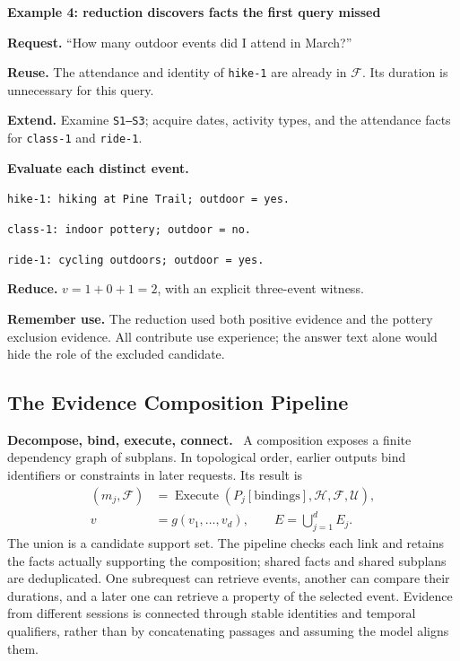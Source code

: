 \documentclass[10pt,twocolumn]{article}
\newcommand{\Hh}{\mathcal{H}}
\newcommand{\Ff}{\mathcal{F}}
\newcommand{\Uu}{\mathcal{U}}
\newcommand{\runin}[1]{\smallskip\noindent\textbf{#1.}\ }
\newenvironment{memoryexample}[1]{%
  \def\FrameCommand{\fboxrule=0.7pt\fboxsep=6pt\fbox}%
  \begin{framed}\small\noindent\textbf{#1}\par\smallskip
}{\end{framed}}
\begin{document}
\begin{memoryexample}{Example 4: reduction discovers facts the first query missed}
\textbf{Request.} ``How many outdoor events did I attend in March?''
\par\textbf{Reuse.} The attendance and identity of \texttt{hike-1} are
already in $\Ff$. Its duration is unnecessary for this query.
\par\textbf{Extend.} Examine \texttt{S1--S3}; acquire dates, activity
types, and the attendance facts for \texttt{class-1} and \texttt{ride-1}.
\par\textbf{Evaluate each distinct event.}
\par\texttt{hike-1: hiking at Pine Trail; outdoor = yes.}
\par\texttt{class-1: indoor pottery; outdoor = no.}
\par\texttt{ride-1: cycling outdoors; outdoor = yes.}
\par\textbf{Reduce.} $v=1+0+1=2$, with an explicit three-event witness.
\par\textbf{Remember use.} The reduction used both positive evidence
and the pottery exclusion evidence. All contribute use experience;
the answer text alone would hide the role of the excluded candidate.
\end{memoryexample}

\subsection{The Evidence Composition Pipeline}
\label{subsec:new-compose}

\runin{Decompose, bind, execute, connect}
A composition exposes a finite dependency graph of subplans. In
topological order, earlier outputs bind identifiers or constraints in
later requests. Its result is
\begin{align}
\label{eq:new-compose}
(m_j,\Ff)&=\operatorname{Execute}
       (P_j[\mathrm{bindings}],\Hh,\Ff,\Uu),\\
v&=g(v_1,\ldots,v_d),\qquad E=\bigcup_{j=1}^{d}E_j.
\end{align}
The union is a candidate support set. The pipeline checks each link
and retains the facts actually supporting the composition; shared
facts and shared subplans are deduplicated. One subrequest can retrieve
events, another can compare their durations, and a later one can
retrieve a property of the selected event. Evidence from different
sessions is connected through stable identities and temporal
qualifiers, rather than by concatenating passages and assuming the
model aligns them.
\end{document}
